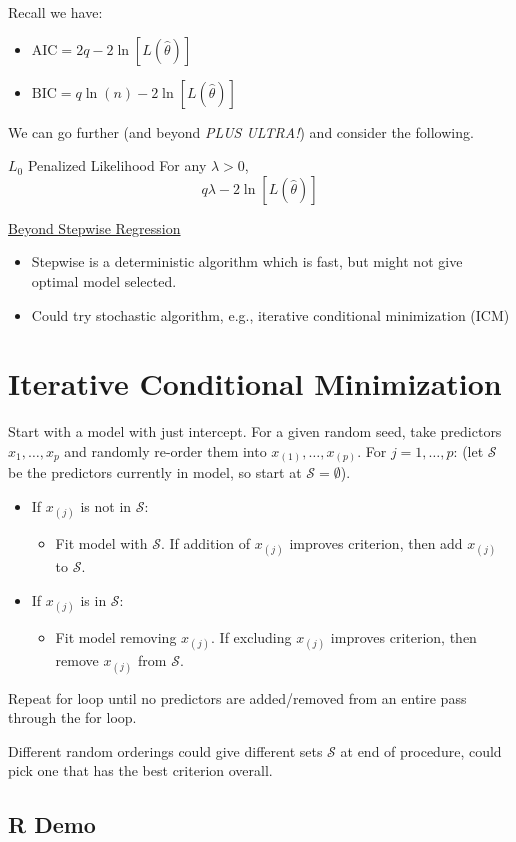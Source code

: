 Recall we have:
\begin{itemize}
    \item $ \text{AIC}=2q-2\ln[L(\hat{\theta})] $
    \item $ \text{BIC}=q\ln(n)-2\ln[L(\hat{\theta})] $
\end{itemize}
We can go further (and beyond \emph{PLUS ULTRA!}) and consider the following.
\begin{Definition}{$ L_0 $ Penalized Likelihood}{}
    For any $ \lambda>0 $,
    \[ q\lambda -2\ln[L(\hat{\theta})] \]
\end{Definition}
\underline{Beyond Stepwise Regression}
\begin{itemize}
    \item Stepwise is a deterministic algorithm which is fast,
          but might not give optimal model selected.
    \item Could try stochastic algorithm, e.g., iterative
          conditional minimization (ICM)
\end{itemize}

\section{Iterative Conditional Minimization}
Start with a model with just intercept.
For a given random seed, take predictors $ x_1,\ldots,x_p $
and randomly re-order them into $ x_{(1)},\ldots,x_{(p)} $.
For $ j=1,\ldots,p $: (let $ \mathcal{S} $ be the predictors
currently in model, so start at $ \mathcal{S}=\emptyset $).
\begin{itemize}
    \item If $ x_{(j)} $ is not in $ \mathcal{S} $:
          \begin{itemize}
              \item Fit model with $ \mathcal{S} $.
                    If addition of $ x_{(j)} $ improves criterion,
                    then add $ x_{(j)} $ to $ \mathcal{S} $.
          \end{itemize}
    \item If $ x_{(j)} $ is in $ \mathcal{S} $:
          \begin{itemize}
              \item Fit model removing $ x_{(j)} $. If excluding
                    $ x_{(j)} $ improves criterion, then remove
                    $ x_{(j)} $ from $ \mathcal{S} $.
          \end{itemize}
\end{itemize}
Repeat for loop until no predictors are added/removed
from an entire pass through the for loop.
\begin{Remark}{}{}
    Different random orderings could give different
    sets $ \mathcal{S} $ at end of procedure, could pick one
    that has the best criterion overall.
\end{Remark}
\subsection{R Demo}

